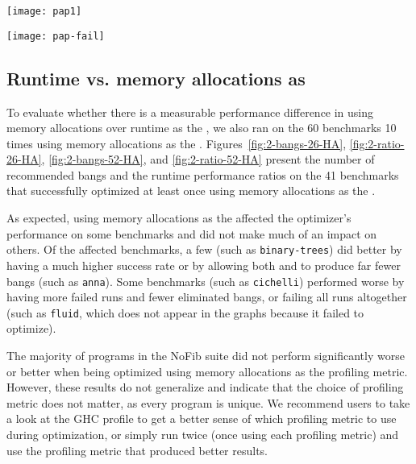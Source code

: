 \begin{figure*}
\texttt{[image: pap1]}
\label{fig:2-ratio-52}
\end{figure*}

\begin{figure*}
\texttt{[image: pap-fail]}
\label{fig:2-failures}
\end{figure*}

\subsection{Runtime vs. memory allocations as \profm{}}

To evaluate whether there is a measurable performance difference in using 
memory allocations over runtime as the \profm{}, we also ran \At{} on the 
60 benchmarks 10 times using memory allocations as the \profm{}. 
Figures~\ref{fig:2-bangs-26-HA}, \ref{fig:2-ratio-26-HA}, \ref{fig:2-bangs-52-HA},
and \ref{fig:2-ratio-52-HA} present the number of recommended bangs and
the runtime performance ratios on the 41 benchmarks that \At{}
successfully optimized at least once using memory allocations as the \profm{}.

As expected, using memory allocations as the \profm{} affected the optimizer's performance
on some benchmarks and did not make much of an impact on others. 
Of the affected benchmarks, a few (such as \texttt{binary-trees}) 
did better by having a much higher success rate or by allowing both \Ao{} and \At{} 
to produce far fewer bangs (such as \texttt{anna}). Some benchmarks (such as \texttt{cichelli}) performed 
worse by having more failed runs and fewer eliminated bangs, or failing all runs altogether
(such as \texttt{fluid}, which does not appear in the graphs because it failed to optimize). 

The majority of programs in the NoFib suite did not perform significantly worse or better
when being optimized using memory allocations as the profiling metric. However, these
results do not generalize and indicate that the choice of profiling metric does not matter,
as every program is unique. 
We recommend users to take a look at the GHC profile to get a better sense of which profiling
metric to use during optimization, or simply run \At{} twice (once using each profiling metric)
and use the profiling metric that produced better results. 

